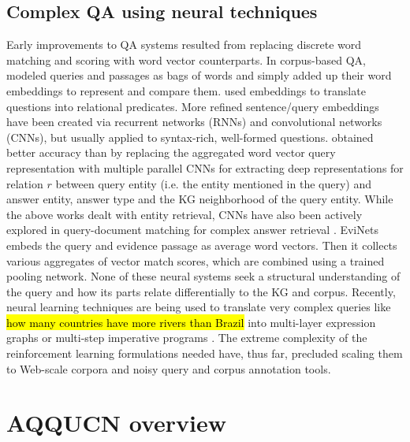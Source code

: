 \documentclass{svjour3}
\DeclareRobustCommand{\query}[1]{{\sethlcolor{qcolor}\sffamily\hl{#1}}}
\begin{document}
\subsection{Complex QA using neural techniques}
\label{sec:Rel:NeuralQA}

Early improvements to QA systems resulted from replacing discrete word matching and scoring with word vector counterparts.  In corpus-based QA, \citet{bordes2014question} modeled queries and passages as bags of words and simply added up their word embeddings to represent and compare them. \citet{yang2014joint} used embeddings to translate questions into relational predicates.  More refined sentence/query embeddings have been created \citep{SeverynM2015SiamConvNet, iyyer2014neural} via recurrent networks (RNNs) and convolutional  networks (CNNs), but usually applied to syntax-rich, well-formed questions. \citet{Dong:2015} obtained better accuracy than \citet{bordes2014question} by replacing the aggregated word vector query representation with multiple parallel CNNs for extracting deep representations for relation $r$ between query entity (i.e. the entity mentioned in the query) and answer entity, answer type and the KG neighborhood of the query entity.  While the above works dealt with entity retrieval, CNNs have also been actively explored in query-document matching for complex answer retrieval \citep{hui2017pacrr, hui2018co, macavaney2018characterizing}.  EviNets \citep{SavenkovA2017EviNets} embeds the query and evidence passage as average word vectors.  Then it collects various aggregates \citep{MacdonaldO2011RankingAggregates} of vector match scores, which are combined using a trained pooling network.  None of these neural systems seek a structural understanding of the query and how its parts relate differentially to the KG and corpus.  Recently, neural learning techniques are being used to translate very complex queries \citep{SahaPKKC2018CSQA} like \query{how many countries have more rivers than Brazil} into multi-layer expression graphs or multi-step imperative programs \citep{AndreasRDK2016ComposeNeuralQA, DongL2016lang2logic, MillerFDKBW2016KVMnet, ZhongXS2017seq2sql, ReedF2015NPI, LiangBLFL2016NSM}.  The extreme complexity of the  reinforcement learning formulations needed have, thus far, precluded scaling them to Web-scale corpora and noisy query and corpus annotation tools.



\section{AQQUCN overview}
\label{sec:OurSystem}
\end{document}
